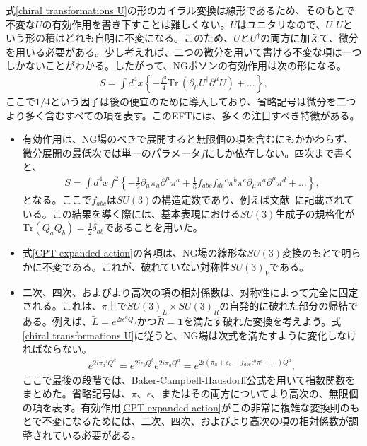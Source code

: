 式\eqref{chiral transformations U}の形のカイラル変換は線形であるため、そのもとで不変な$U$の有効作用を書き下すことは難しくない。$U$はユニタリなので、$U^\dag U$という形の積はどれも自明に不変になる。このため、$U$と$U^\dag$の両方に加えて、微分を用いる必要がある。少し考えれば、二つの微分を用いて書ける不変な項は一つしかないことがわかる。したがって、NGボソンの有効作用は次の形になる。
%
\begin{align} \label{CPT action}
	S = \int d^4 x \left\{ - \frac{f^2}{4} \mbox{Tr} \, ( \partial_\mu U^\dag \partial^\mu U ) + \dots \right\} ,
\end{align}
%
ここで$1/4$という因子は後の便宜のために導入しており、省略記号は微分を二つより多く含むすべての項を表す。このEFTには、多くの注目すべき特徴がある。
%
\begin{itemize}
	\item 有効作用は、NG場のべきで展開すると無限個の項を含むにもかかわらず、微分展開の最低次では単一のパラメータ$f$にしか依存しない。四次まで書くと、
%
\begin{align} \label{CPT expanded action}
	S = \int d^4 x \, f^2 \left\{ - \frac{1}{2} \partial_\mu \pi_a \partial^\mu \pi^a + \frac{1}{6} f_{abc} f_{de}{}^c \pi^b \pi^e \partial_\mu \pi^a \partial^\mu \pi^d  + \dots \right\} ,
\end{align}
%
となる。ここで$f_{abc}$は$SU(3)$の構造定数であり、例えば文献~\cite{Scherer:2002tk}に記載されている。この結果を導く際には、基本表現における$SU(3)$生成子の規格化が$\mbox{Tr} (Q_a Q_b) = \frac{1}{2}\delta_{ab}$であることを用いた。
	\item 式\eqref{CPT expanded action}の各項は、NG場の線形な$SU(3)$変換のもとで明らかに不変である。これが、破れていない対称性$SU(3)_V$である。
	\item 二次、四次、およびより高次の項の相対係数は、対称性によって完全に固定される。これは、$\pi$上で$SU(3)_L \times SU(3)_R$の自発的に破れた部分の帰結である。例えば、$\tilde L = e^{2 i \epsilon^a Q_a}$かつ$\tilde R = \mathbf{1}$を満たす破れた変換を考えよう。式\eqref{chiral transformations U}に従うと、NG場は次式を満たすように変化しなければならない。
	\begin{align} \label{nonlinearly realized symmetries}
		e^{2 i \pi_a' Q^a}  = e^{2 i \epsilon_b Q^b} e^{2 i \pi_a Q^a} = e^{2 i (\pi_a + \epsilon_a - f_{abc} \epsilon^b \pi^c + \cdots ) Q^a } ,
	\end{align}
ここで最後の段階では、Baker-Campbell-Hausdorff公式を用いて指数関数をまとめた。省略記号は、$\pi$、$\epsilon$、またはその両方についてより高次の、無限個の項を表す。有効作用\eqref{CPT expanded action}がこの非常に複雑な変換則のもとで不変になるためには、二次、四次、およびより高次の項の相対係数が調整されている必要がある。

\end{itemize}
